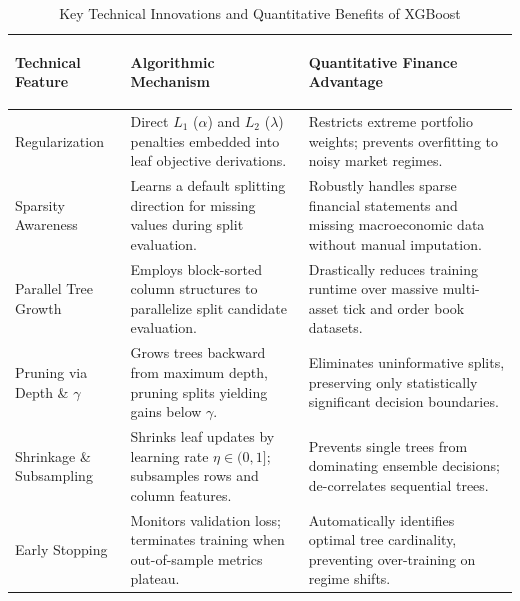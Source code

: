 \begin{table}[!htbp]
\centering
\caption{Key Technical Innovations and Quantitative Benefits of XGBoost}
\label{tab:xgboost_features}
\vspace{0.2em}
\renewcommand{\arraystretch}{1.3}
\begin{tabularx}{\textwidth}{>{\bfseries\raggedright\arraybackslash}p{3.3cm}XX}
\toprule
Technical Feature & Algorithmic Mechanism & Quantitative Finance Advantage \\
\midrule
Regularization & Direct $L_1$ ($\alpha$) and $L_2$ ($\lambda$) penalties embedded into leaf objective derivations. & Restricts extreme portfolio weights; prevents overfitting to noisy market regimes. \\
Sparsity Awareness & Learns a default splitting direction for missing values during split evaluation. & Robustly handles sparse financial statements and missing macroeconomic data without manual imputation. \\
Parallel Tree Growth & Employs block-sorted column structures to parallelize split candidate evaluation. & Drastically reduces training runtime over massive multi-asset tick and order book datasets. \\
Pruning via Depth \& $\gamma$ & Grows trees backward from maximum depth, pruning splits yielding gains below $\gamma$. & Eliminates uninformative splits, preserving only statistically significant decision boundaries. \\
Shrinkage \& Subsampling & Shrinks leaf updates by learning rate $\eta \in (0, 1]$; subsamples rows and column features. & Prevents single trees from dominating ensemble decisions; de-correlates sequential trees. \\
Early Stopping & Monitors validation loss; terminates training when out-of-sample metrics plateau. & Automatically identifies optimal tree cardinality, preventing over-training on regime shifts. \\
\bottomrule
\end{tabularx}
\end{table}
